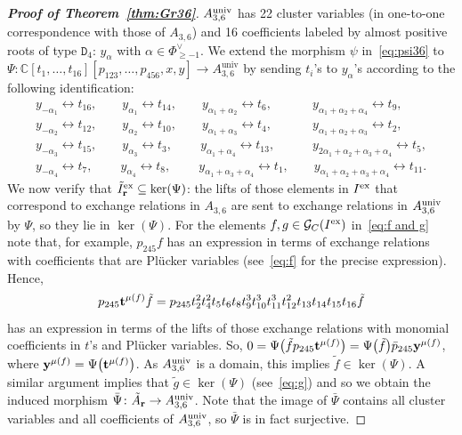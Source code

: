 \documentclass[10pt,a4paper]{amsart}
\numberwithin{equation}{section}
\DeclareMathOperator{\univ}{univ}
\begin{document}
\begin{proof}[{\bf Proof of Theorem~\ref{thm:Gr36}}]
 \medskip
  $A_{3,6}^{\rm univ}$ has 22 cluster variables (in one-to-one correspondence with those of $A_{3,6}$) and 16 coefficients labeled by almost positive roots of type ${\mathtt D}_4$: $y_\alpha$ with $\alpha\in \Phi_{\geq -1}^{\vee}$.
 We extend the morphism $\psi$
 in~\eqref{eq:psi36} to $\Psi\colon \mathbb C[t_1,\dots,t_{16}][p_{123}, \dots , p_{456}, x,y]\to A_{3,6}^{\univ}$ by sending $t_i$'s to $y_\alpha$'s according to the following identification:
\begin{gather}\label{eq:y-t}
y_{-\alpha_1} \leftrightarrow t_{16},\qquad
y_{\alpha_1} \leftrightarrow t_{14},\qquad
y_{\alpha_1 + \alpha_2} \leftrightarrow t_{6},\qquad\quad\
y_{\alpha_1 +\alpha_2+\alpha_4} \leftrightarrow t_{9}, \nonumber
\\
y_{-\alpha_2} \leftrightarrow t_{12},\qquad
y_{\alpha_2} \leftrightarrow t_{10},\qquad
y_{\alpha_1 + \alpha_3} \leftrightarrow t_{4},\qquad\quad\
y_{\alpha_1 +\alpha_2+\alpha_3} \leftrightarrow t_{2}, \nonumber
\\
y_{-\alpha_3} \leftrightarrow t_{15},\qquad
y_{\alpha_3} \leftrightarrow t_{3},\qquad\
y_{\alpha_1 + \alpha_4} \leftrightarrow t_{13},\qquad\quad
y_{2\alpha_1 + \alpha_2+\alpha_3+\alpha_4} \leftrightarrow t_{5}, \nonumber
\\
y_{-\alpha_4} \leftrightarrow t_{7},\qquad\
y_{\alpha_4} \leftrightarrow t_{8},\qquad\
y_{\alpha_1 +\alpha_3+\alpha_4} \leftrightarrow t_{1},\qquad
y_{\alpha_1 + \alpha_2+\alpha_3+\alpha_4} \leftrightarrow t_{11}.
 \end{gather}
 We now verify that $\tilde I^{\rm ex}_{\bf r}\subseteq \ker(\Psi)$: the lifts of those elements in $I^{\rm ex}$ that correspond to exchange relations in $A_{3,6}$ are sent to exchange relations in $A_{3,6}^{\rm univ}$ by $\Psi$, so they lie in $\ker(\Psi)$.
 For the elements $f,g\in\mathcal{G}_C(I^{\rm ex})$ in~\eqref{eq:f and g}
 note that, for example, $p_{245}f$ has an expression in terms of exchange relations with coefficients that are Pl\"ucker variables (see~\eqref{eq:f} for the precise expression).
 Hence,
 \begin{displaymath}
 p_{245}{\bf t}^{\mu(f)}\tilde f= p_{245}t_2^2t_4^2t_5t_6t_8t_9^3t_{10}^3t_{11}^3t_{12}^2t_{13}t_{14}t_{15}t_{16}\tilde f
 \end{displaymath}
 has an expression in terms of the lifts of those exchange relations with monomial coefficients in $t$'s and Pl\"ucker variables.
 So, $ 0=\Psi\big(\tilde fp_{245}{\bf t}^{\mu(f)}\big)=\Psi\big(\tilde f\big)\bar p_{245}{\bf y}^{\mu(f)}$,
 where ${\bf y}^{\mu(f)}=\Psi\big({\bf t}^{\mu(f)}\big)$.
 As $A_{3,6}^{\rm univ}$ is a domain, this implies $\tilde f\in \ker(\Psi)$.
 A similar argument implies that $\tilde g\in \ker(\Psi)$ (see~\eqref{eq:g}) and so we obtain the induced morphism $\bar\Psi\colon \tilde A_{\bf r}\to A_{3,6}^{\rm univ}$.
 Note that the image of $\bar \Psi$ contains all cluster variables and all coefficients of $A_{3,6}^{\rm univ}$, so $\bar \Psi$ is in fact surjective.


\end{proof}
\end{document}
